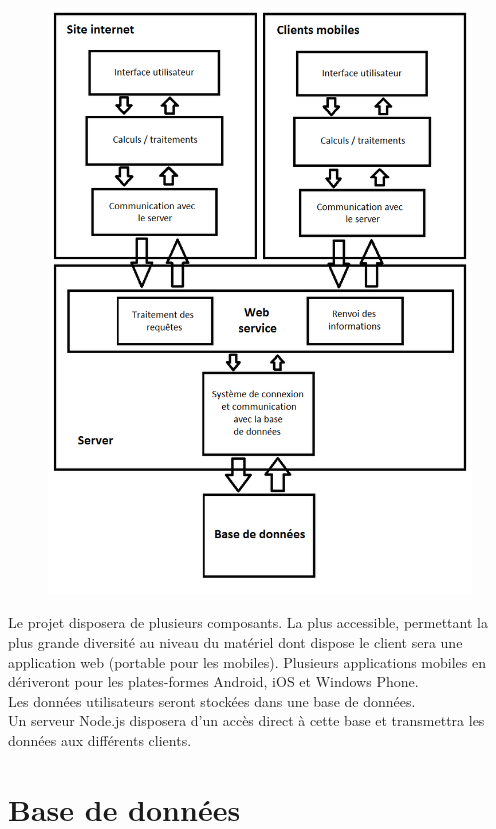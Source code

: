 \documentclass{life-fr}
\begin{document}
\begin{figure}[H]
  \begin{center}
    \includegraphics[width=11.5cm]{img/couches_application.png}
  \end{center}
\end{figure}

Le projet disposera de plusieurs composants.
La plus accessible, permettant la plus grande diversité au niveau du matériel dont dispose le client sera une application web (portable pour les mobiles).
Plusieurs applications mobiles en dériveront pour les plates-formes Android, iOS et Windows Phone.
\\
Les données utilisateurs seront stockées dans une base de données.
\\
Un serveur Node.js disposera d’un accès direct à cette base et transmettra les données aux différents clients.


\chapter{Base de données}
\end{document}
